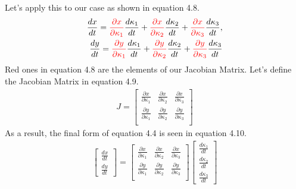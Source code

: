 \documentclass[12pt,twoside,a4]{mwbk}
\begin{document}
Let's apply this to our case as shown in equation 4.8.
\begin{subequations}
\begin{align}
    \frac{dx}{dt} = {\color{red} \frac{\partial x}{\partial \kappa_1}} \frac{d \kappa_1}{dt} + {\color{red} \frac{\partial x}{\partial \kappa_2} }\frac{d\kappa_2}{dt} +{\color{red}  \frac{\partial x}{\partial \kappa_3}} \frac{d \kappa_3}{dt}, \\
    \frac{dy}{dt} ={\color{red}  \frac{\partial y}{\partial \kappa_1}} \frac{d \kappa_1}{dt} + {\color{red} \frac{\partial y}{\partial \kappa_2}} \frac{d \kappa_2}{dt} + {\color{red} \frac{\partial y}{\partial \kappa_3}} \frac{d \kappa_3}{dt}
\end{align}
\end{subequations}
Red ones in equation 4.8 are the elements of our Jacobian Matrix. Let's define the Jacobian Matrix in equation 4.9.
\begin{subequations}
\begin{align}
    J = 
\begin{bmatrix}
 \frac{\partial x}{\partial \kappa_1}& \frac{\partial x}{\partial \kappa_2} &  \frac{\partial x}{\partial \kappa_3}\\
\frac{\partial y}{\partial \kappa_1} & \frac{\partial y}{\partial \kappa_2} & \frac{\partial y}{\partial \kappa_3} \\
\end{bmatrix}
\end{align}
\end{subequations}
As a result, the final form of equation 4.4 is seen in equation 4.10.
\begin{subequations}
\begin{align}
    \begin{bmatrix}
\frac{dx}{dt} \\ \frac{dy}{dt}
\end{bmatrix} =\begin{bmatrix}
 \frac{\partial x}{\partial \kappa_1}& \frac{\partial x}{\partial \kappa_2} &  \frac{\partial x}{\partial \kappa_3}\\
\frac{\partial y}{\partial \kappa_1} & \frac{\partial y}{\partial \kappa_2} & \frac{\partial y}{\partial \kappa_3} \\
\end{bmatrix} \begin{bmatrix}
\frac{d \kappa_1}{dt} \\ \frac{d \kappa_2}{dt}
 \\ \frac{d \kappa_3}{dt}
\end{bmatrix}
\end{align}
\end{subequations}
\end{document}
